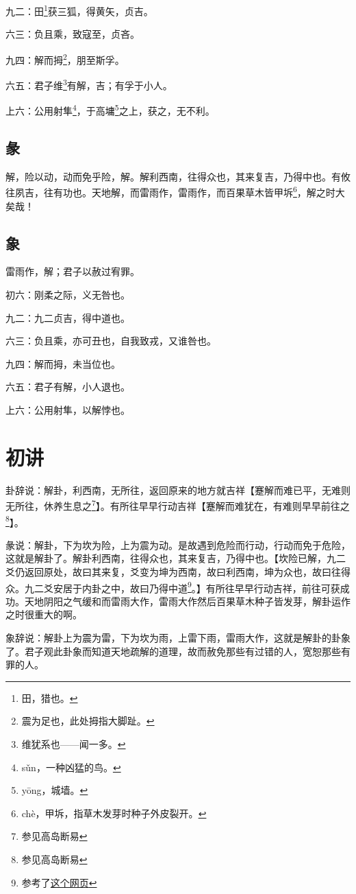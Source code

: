 \documentclass[12pt,oneside]{book}
\begin{document}
九二：田\footnote{田，猎也。}获三狐，得黄矢，贞吉。

六三：负且乘，致寇至，贞吝。

九四：解而拇\footnote{震为足也，此处拇指大脚趾。}，朋至斯孚。

六五：君子维\footnote{维犹系也——闻一多。}有解，吉；有孚于小人。

上六：公用射隼\footnote{sǔn，一种凶猛的鸟。}，于高墉\footnote{yōng，城墙。}之上，获之，无不利。

\subsection{彖}
解，险以动，动而免乎险，解。解利西南，往得众也，其来复吉，乃得中也。有攸往夙吉，往有功也。天地解，而雷雨作，雷雨作，而百果草木皆甲坼\footnote{chè，甲坼，指草木发芽时种子外皮裂开。}，解之时大矣哉！

\subsection{象}
雷雨作，解；君子以赦过宥罪。

初六：刚柔之际，义无咎也。

九二：九二贞吉，得中道也。

六三：负且乘，亦可丑也，自我致戎，又谁咎也。

九四：解而拇，未当位也。

六五：君子有解，小人退也。

上六：公用射隼，以解悖也。

\section{初讲}
卦辞说：解卦，利西南，无所往，返回原来的地方就吉祥【蹇解而难已平，无难则无所往，休养生息之\footnote{参见高岛断易}】。有所往早早行动吉祥【蹇解而难犹在，有难则早早前往之\footnote{参见高岛断易}】。

彖说：解卦，下为坎为险，上为震为动。是故遇到危险而行动，行动而免于危险，这就是解卦了。解卦利西南，往得众也，其来复吉，乃得中也。【坎险已解，九二爻仍返回原处，故曰其来复，爻变为坤为西南，故曰利西南，坤为众也，故曰往得众。九二爻安居于内卦之中，故曰乃得中道\footnote{参考了\href{https://www.eee-learning.com/book/neweee40}{这个网页}}。】有所往早早行动吉祥，前往可获成功。天地阴阳之气缓和而雷雨大作，雷雨大作然后百果草木种子皆发芽，解卦运作之时很重大的啊。

象辞说：解卦上为震为雷，下为坎为雨，上雷下雨，雷雨大作，这就是解卦的卦象了。君子观此卦象而知道天地疏解的道理，故而赦免那些有过错的人，宽恕那些有罪的人。
\end{document}
